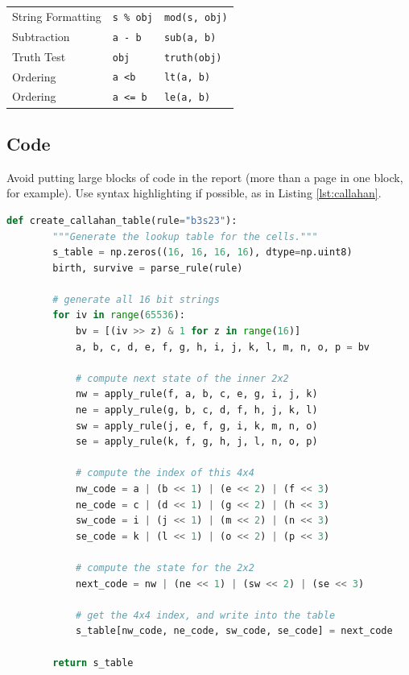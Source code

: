\documentclass{l4proj}
\begin{document}
\begin{table}[]
\begin{tabular}{@{}lll@{}}
    String Formatting     & \texttt{s \% obj}                       & \texttt{mod(s, obj)}                                  \\
    Subtraction           & \texttt{a - b}                          & \texttt{sub(a, b)}                                    \\
    Truth Test            & \texttt{obj}                            & \texttt{truth(obj)}                                   \\
    Ordering              & \texttt{a \textless b}                  & \texttt{lt(a, b)}                                     \\
    Ordering              & \texttt{a \textless{}= b}               & \texttt{le(a, b)}                                     \\
    \end{tabular}
    \end{table}
\subsection{Code}

Avoid putting large blocks of code in the report (more than a page in one block, for example). Use syntax highlighting if possible, as in Listing \ref{lst:callahan}.

\begin{lstlisting}[language=python, float, caption={The algorithm for packing the $3\times 3$ outer-totalistic binary CA successor rule into a 
    $16\times 16\times 16\times 16$ 4 bit lookup table, running an equivalent, notionally 16-state $2\times 2$ CA.}, label=lst:callahan]
    def create_callahan_table(rule="b3s23"):
        """Generate the lookup table for the cells."""        
        s_table = np.zeros((16, 16, 16, 16), dtype=np.uint8)
        birth, survive = parse_rule(rule)

        # generate all 16 bit strings
        for iv in range(65536):
            bv = [(iv >> z) & 1 for z in range(16)]
            a, b, c, d, e, f, g, h, i, j, k, l, m, n, o, p = bv

            # compute next state of the inner 2x2
            nw = apply_rule(f, a, b, c, e, g, i, j, k)
            ne = apply_rule(g, b, c, d, f, h, j, k, l)
            sw = apply_rule(j, e, f, g, i, k, m, n, o)
            se = apply_rule(k, f, g, h, j, l, n, o, p)

            # compute the index of this 4x4
            nw_code = a | (b << 1) | (e << 2) | (f << 3)
            ne_code = c | (d << 1) | (g << 2) | (h << 3)
            sw_code = i | (j << 1) | (m << 2) | (n << 3)
            se_code = k | (l << 1) | (o << 2) | (p << 3)

            # compute the state for the 2x2
            next_code = nw | (ne << 1) | (sw << 2) | (se << 3)

            # get the 4x4 index, and write into the table
            s_table[nw_code, ne_code, sw_code, se_code] = next_code

        return s_table

\end{lstlisting}
\end{document}
